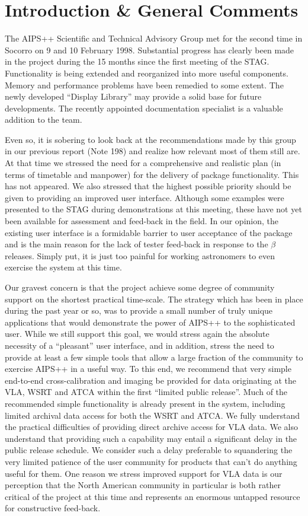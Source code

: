 \section{Introduction \& General Comments}

The AIPS++ Scientific and Technical Advisory Group met for the second
time in Socorro on 9 and 10 February 1998. Substantial progress has
clearly been made in the project during the 15 months since the first
meeting of the STAG. Functionality is being extended and reorganized
into more useful components. Memory and performance problems have been
remedied to some extent. The newly developed ``Display Library'' may
provide a solid base for future developments. The recently appointed
documentation specialist is a valuable addition to the team.

Even so, it is sobering to look back at the recommendations made by
this group in our previous report (Note 198) and realize how relevant
most of them still are. At that time we stressed the need for a
comprehensive and realistic plan (in terms of timetable and manpower)
for the delivery of package functionality. This has not appeared. We
also stressed that the highest possible priority should be given to
providing an improved user interface. Although some examples were
presented to the STAG during demonstrations at this meeting, these
have not yet been available for assessment and feed-back in the field.
In our opinion, the existing user interface is a formidable barrier to
user acceptance of the package and is the main reason for the lack of
tester feed-back in response to the $\beta$ releases. Simply put, it is
just too painful for working astronomers to even exercise the system
at this time.

Our gravest concern is that the project achieve some degree of
community support on the shortest practical time-scale. The strategy
which has been in place during the past year or so, was to provide a
small number of truly unique applications that would demonstrate the
power of AIPS++ to the sophisticated user. While we still support this
goal, we would stress again the absolute necessity of a ``pleasant''
user interface, and in addition, stress the need to provide at least a
few simple tools that allow a large fraction of the community to
exercise AIPS++ in a useful way. To this end, we recommend that very
simple end-to-end cross-calibration and imaging be provided for data
originating at the VLA, WSRT and ATCA within the first ``limited
public release''.  Much of the recommended simple functionality is
already present in the system, including limited archival data access
for both the WSRT and ATCA. We fully understand the practical
difficulties of providing direct archive access for VLA data.
We also understand that providing such a capability may
entail a significant delay in the public release schedule. We consider
such a delay preferable to squandering the very limited patience of
the user community for products that can't do anything useful for
them. One reason we stress improved support for VLA data is our
perception that the North American community in particular is both
rather critical of the project at this time and represents an
enormous untapped resource for constructive feed-back.  

